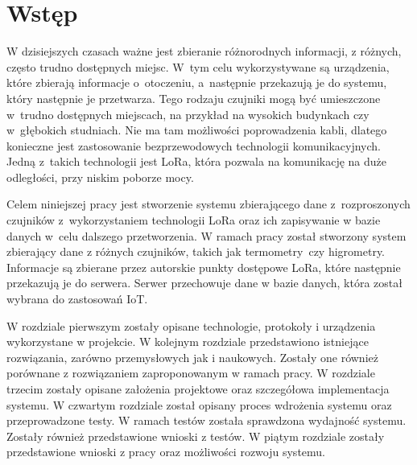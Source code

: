 
\chapter*{Wstęp} %
W dzisiejszych czasach ważne jest zbieranie różnorodnych informacji, z różnych, często trudno dostępnych miejsc. W~tym celu wykorzystywane są urządzenia, które zbierają informacje o~otoczeniu, a~następnie przekazują je do systemu, który następnie je przetwarza. Tego rodzaju czujniki mogą być umieszczone w~trudno dostępnych miejscach, na przykład na wysokich budynkach czy w~głębokich studniach. Nie ma tam możliwości poprowadzenia kabli, dlatego konieczne jest zastosowanie bezprzewodowych technologii komunikacyjnych. Jedną z~takich technologii jest LoRa, która pozwala na komunikację na duże odległości, przy niskim poborze mocy.

Celem niniejszej pracy jest stworzenie systemu zbierającego dane z~rozproszonych czujników z~wykorzystaniem technologii LoRa oraz ich zapisywanie w bazie danych w~celu dalszego przetworzenia.
W ramach pracy został stworzony system zbierający dane z różnych czujników, takich jak termometry~czy higrometry.
Informacje są zbierane przez autorskie punkty dostępowe LoRa, które następnie przekazują je do serwera.
Serwer przechowuje dane w bazie danych, która został wybrana do zastosowań IoT.

W rozdziale pierwszym zostały opisane technologie, protokoły i urządzenia wykorzystane w projekcie.
W kolejnym rozdziale przedstawiono istniejące rozwiązania, zarówno przemysłowych jak i naukowych. Zostały one również porównane z rozwiązaniem zaproponowanym w ramach pracy.
W rozdziale trzecim zostały opisane założenia projektowe oraz szczegółowa implementacja systemu.
W czwartym rozdziale został opisany proces wdrożenia systemu oraz przeprowadzone testy. W ramach testów została sprawdzona wydajność systemu. Zostały również przedstawione wnioski z testów.
W piątym rozdziale zostały przedstawione wnioski z pracy oraz możliwości rozwoju systemu.
